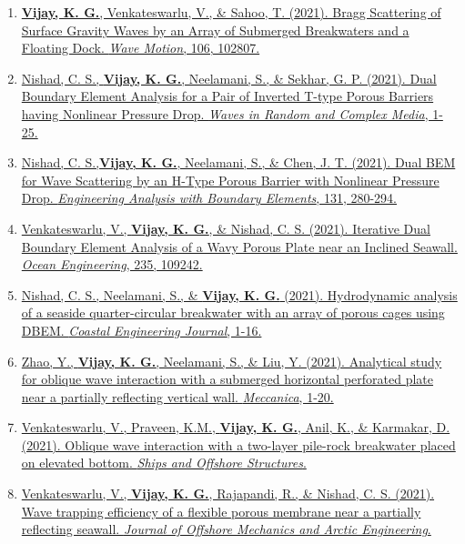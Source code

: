 \begin{enumerate}[label=\protect\circled{\arabic*}]
\item \href{https://doi.org/10.1016/j.wavemoti.2021.102807}{%
\textbf{Vijay, K. G.}, Venkateswarlu, V., \& Sahoo, T. (2021). Bragg Scattering of Surface Gravity Waves by an Array of Submerged Breakwaters and a Floating Dock. \textit{Wave Motion}, 106, 102807.}

\item \href{https://doi.org/10.1080/17455030.2021.1948145}{%
Nishad, C. S., \textbf{Vijay, K. G.}, Neelamani, S., \& Sekhar, G. P. (2021). Dual Boundary Element Analysis for a Pair of Inverted T-type Porous Barriers having Nonlinear Pressure Drop. \textit{Waves in Random and Complex Media}, 1-25.}

\item \href{https://doi.org/10.1016/j.enganabound.2021.06.011}{%
Nishad, C. S.,\textbf{Vijay, K. G.}, Neelamani, S., \& Chen, J. T. (2021). Dual BEM for Wave Scattering by an H-Type Porous Barrier with Nonlinear Pressure Drop. \textit{Engineering Analysis with Boundary Elements}, 131, 280-294.} 

\item \href{https://doi.org/10.1016/j.oceaneng.2021.109242}{%
Venkateswarlu, V., \textbf{Vijay, K. G.}, \& Nishad, C. S. (2021). Iterative Dual Boundary Element Analysis of a Wavy Porous Plate near an Inclined Seawall. \textit{Ocean Engineering}, 235, 109242.}

\item \href{https://doi.org/10.1080/21664250.2021.1909965}{%
Nishad, C. S., Neelamani, S., \& \textbf{Vijay, K. G.} (2021). Hydrodynamic analysis of a seaside quarter-circular breakwater with an array of porous cages using DBEM. \textit{Coastal Engineering Journal}, 1-16.}

\item \href{https://doi.org/10.1007/s11012-021-01339-x}{%
Zhao, Y., \textbf{Vijay, K. G.}, Neelamani, S., \& Liu, Y. (2021). Analytical study for oblique wave interaction with a submerged horizontal perforated plate near a partially reflecting vertical wall. \textit{Meccanica}, 1-20.}


\item \href{https://doi.org/10.1080/17445302.2021.1880183}{%
Venkateswarlu, V., Praveen, K.M., \textbf{Vijay, K. G.}, Anil, K., \& Karmakar, D. (2021). Oblique wave interaction with a two-layer pile-rock breakwater placed on elevated bottom. \textit{Ships and Offshore Structures}.}

\item \href{https://doi.org/10.1115/1.4050058}{%
Venkateswarlu, V., \textbf{Vijay, K. G.}, Rajapandi, R., \& Nishad, C. S. (2021). Wave trapping efficiency of a flexible porous membrane near a partially reflecting seawall. \textit{Journal of Offshore Mechanics and Arctic Engineering}.}


\end{enumerate}
